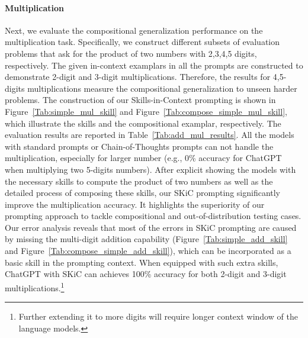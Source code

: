 \paragraph{Multiplication} 
Next, we evaluate the compositional generalization performance on the multiplication task. Specifically, we construct different subsets of evaluation problems that ask for the product of two numbers with 2,3,4,5 digits, respectively. The given in-context examplars in all the prompts are constructed to demonstrate 2-digit and 3-digit multiplications. Therefore, the results for 4,5-digits multiplications measure the compositional generalization to unseen harder problems.
The construction of our Skills-in-Context prompting is shown in Figure~\ref{Tab:simple_mul_skill} and Figure~\ref{Tab:compose_simple_mul_skill}, which illustrate the skills and the compositional examplar, respectively. The evaluation results are reported in Table~\ref{Tab:add_mul_results}. All the models with standard prompts or Chain-of-Thoughts prompts can not handle the multiplication, especially for larger number (e.g., 0\% accuracy for ChatGPT when multiplying two 5-digits numbers). After explicit showing the models with the necessary skills to compute the product of two numbers as well as the detailed process of composing these skills, our SKiC prompting significantly improve the multiplication accuracy. It highlights the superiority of our prompting approach to tackle compositional and out-of-distribution testing cases. Our error analysis reveals that most of the errors in SKiC prompting are caused by missing the multi-digit addition capability (Figure~\ref{Tab:simple_add_skill} and Figure~\ref{Tab:compose_simple_add_skill}), which can be incorporated as a basic skill in the prompting context. When equipped with such extra skills, ChatGPT with SKiC can achieves 100\% accuracy for both 2-digit and 3-digit multiplications.\footnote{Further extending it to more digits will require longer context window of the language models.}











